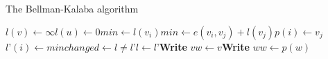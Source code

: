 \documentclass{article}
\begin{document}
\begin{algorithm}\caption{The Bellman-Kalaba algorithm}\begin{algorithmic}[1]\State $l(v) \leftarrow \infty$\EndFor\State $l(u) \leftarrow 0$\Repeat{}\State $min \leftarrow l(v_i)$\State $min \leftarrow e(v_i, v_j) + l(v_j)$\State $p(i) \leftarrow v_j$\EndIf\EndFor\State $l’(i) \leftarrow min$\EndFor\State $changed \leftarrow l \not= l’$\State $l \leftarrow l’$\EndProcedure\Statex{}\State \textbf{Write} $v$\Else\State $w \leftarrow v$\State \textbf{Write} $w$\State $w \leftarrow p(w)$\EndWhile\EndIf\EndProcedure\end{algorithmic}
\end{algorithm}
\end{document}
